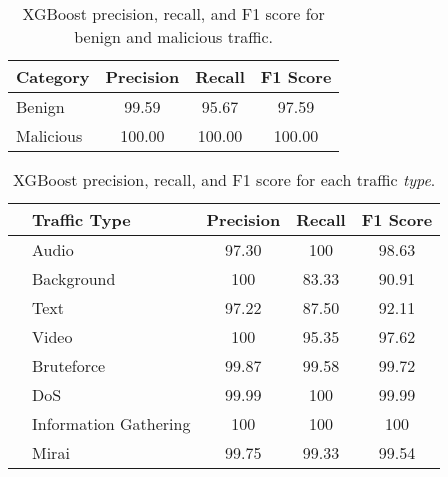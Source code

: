 \documentclass[lettersize,journal]{IEEEtran}
\begin{document}
\begin{table}[t]
    \centering
    \caption{XGBoost precision, recall, and F1 score for benign and malicious traffic.}
    \begin{tabularx}{\columnwidth}{lCCC} 
        \toprule
        \textbf{Category} & \textbf{Precision} & \textbf{Recall} & \textbf{F1 Score} \\
        \midrule
        Benign & 99.59 & 95.67 & 97.59 \\
        Malicious & 100.00 &  100.00 & 100.00 \\    
        \bottomrule
    \end{tabularx} 
    \label{tab:exp_sup_binary_detailed}
\end{table}
 
\begin{table}[t]
    \centering
    \caption{XGBoost precision, recall, and F1 score for each traffic \textit{type}.}
    \begin{tabularx}{\columnwidth}{l l CCC} 
        \toprule
            {} & \textbf{Traffic Type }& \textbf{Precision}  &       \textbf{Recall}  &   \textbf{F1 Score} \\
        \midrule
             & Audio &  97.30 &  100 &   98.63 \\
            {} & Background & 100 &   83.33 &   90.91 \\
            {} & Text &  97.22 &   87.50 &   92.11 \\
            {} & Video & 100 &   95.35 &   97.62 \\
        \midrule
             & Bruteforce &  99.87 &   99.58 &   99.72 \\
            {} & DoS &  99.99 &  100 &   99.99 \\
            {} & Information Gathering & 100 &  100 &  100 \\
            {} & Mirai &  99.75 &   99.33 &   99.54 \\       
        \bottomrule
    \end{tabularx} 
    \label{tab:exp_sup_multiclass_type_detailed}
\end{table}  
\end{document}
